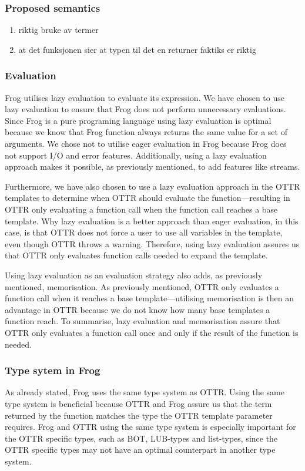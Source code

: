 \subsubsection{Proposed semantics}
\begin{enumerate}
    \item riktig bruke av termer 
    \item at det funksjonen sier at typen til det en returner faktiks er riktig
\end{enumerate}

\subsubsection{Evaluation}
Frog utilises lazy evaluation to evaluate its expression. We have chosen to use lazy evaluation to ensure that Frog does not perform unnecessary evaluations. Since Frog is a pure programing language using lazy evaluation is optimal because we know that Frog function always returns the same value for a set of arguments. We chose not to utilise eager evaluation in Frog because Frog does not support I/O and error features. Additionally, using a lazy evaluation approach makes it possible, as previously mentioned, to add features like streams.

\para
Furthermore, we have also chosen to use a lazy evaluation approach in the OTTR templates to determine when OTTR should evaluate the function—resulting in OTTR only evaluating a function call when the function call reaches a base template. Why lazy evaluation is a better approach than eager evaluation, in this case, is that OTTR does not force a user to use all variables in the template, even though OTTR throws a warning. Therefore, using lazy evaluation assures us that OTTR only evaluates function calls needed to expand the template.  

\para
Using lazy evaluation as an evaluation strategy also adds, as previously mentioned, memorisation. As previously mentioned, OTTR only evaluates a function call when it reaches a base template—utilising memorisation is then an advantage in OTTR because we do not know how many base templates a function reach. To summarise, lazy evaluation and memorisation assure that OTTR only evaluates a function call once and only if the result of the function is needed.

\subsubsection{Type sytem in Frog}
\label{types in frog}
As already stated, Frog uses the same type system as OTTR. Using the same type system is beneficial because OTTR and Frog assure us that the term returned by the function matches the type the OTTR template parameter requires. Frog and OTTR using the same type system is especially important for the OTTR specific types, such as BOT, LUB-types and list-types, since the OTTR specific types may not have an optimal counterpart in another type system.

